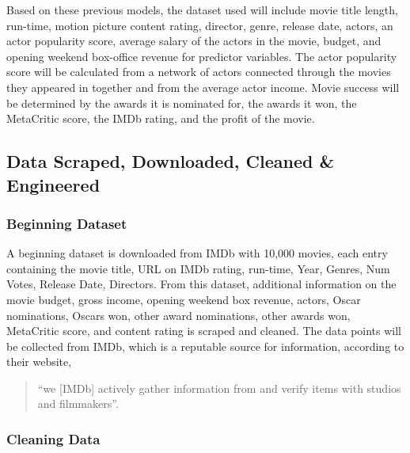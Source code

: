 \documentclass[11pt]{article}
\begin{document}
Based on these previous models, the dataset used will include movie
title length, run-time, motion picture content rating, director, genre,
release date, actors, an actor popularity score, average salary of the
actors in the movie, budget, and opening weekend box-office revenue for
predictor variables. The actor popularity score will be calculated from
a network of actors connected through the movies they appeared in
together and from the average actor income. Movie success will be
determined by the awards it is nominated for, the awards it won, the
MetaCritic score, the IMDb rating, and the profit of the movie.

    \hypertarget{data-scraped-downloaded-cleaned-engineered}{%
\subsection{Data Scraped, Downloaded, Cleaned \&
Engineered}\label{data-scraped-downloaded-cleaned-engineered}}

\hypertarget{beginning-dataset}{%
\subsubsection{Beginning Dataset}\label{beginning-dataset}}

A beginning dataset is downloaded from IMDb with 10,000 movies, each
entry containing the movie title, URL on IMDb rating, run-time, Year,
Genres, Num Votes, Release Date, Directors. From this dataset,
additional information on the movie budget, gross income, opening
weekend box revenue, actors, Oscar nominations, Oscars won, other award
nominations, other awards won, MetaCritic score, and content rating is
scraped and cleaned. The data points will be collected from IMDb, which
is a reputable source for information, according to their website,

\begin{quote}
``we {[}IMDb{]} actively gather information from and verify items with
studios and filmmakers''.
\end{quote}

\hypertarget{cleaning-data}{%
\subsubsection{Cleaning Data}\label{cleaning-data}}
\end{document}
